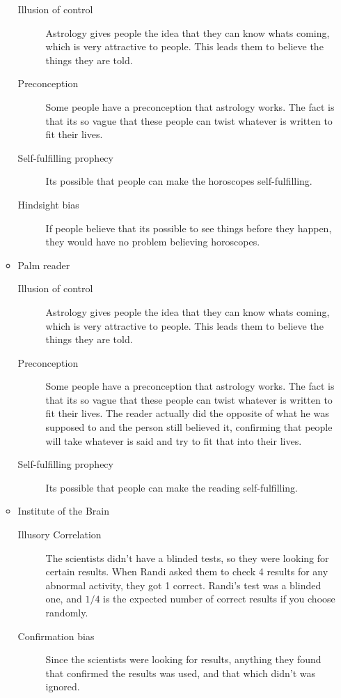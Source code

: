 \documentclass[10pt, a4paper]{article}
\begin{document}
\begin{enumerate}
\begin{itemize}
\begin{description}
          \item[Illusion of control] Astrology gives people the idea that they can know whats coming, which is very attractive to people. This leads them to believe the things they are told.
          \item[Preconception] Some people have a preconception that astrology works. The fact is that its so vague that these people can twist whatever is written to fit their lives.
          \item[Self-fulfilling prophecy] Its possible that people can make the horoscopes self-fulfilling.
          \item[Hindsight bias] If people believe that its possible to see things before they happen, they would have no problem believing horoscopes.
        \end{description}
      \item Palm reader
        \begin{description}
          \item[Illusion of control] Astrology gives people the idea that they can know whats coming, which is very attractive to people. This leads them to believe the things they are told.
          \item[Preconception] Some people have a preconception that astrology works. The fact is that its so vague that these people can twist whatever is written to fit their lives. The reader actually did the opposite of what he was supposed to and the person still believed it, confirming that people will take whatever is said and try to fit that into their lives.
          \item[Self-fulfilling prophecy] Its possible that people can make the reading self-fulfilling.
        \end{description}
      \item Institute of the Brain
        \begin{description}
          \item[Illusory Correlation] The scientists didn't have a blinded tests, so they were looking for certain results. When Randi asked them to check 4 results for any abnormal activity, they got 1 correct. Randi's test was a blinded one, and $1/4$ is the expected number of correct results if you choose randomly.
          \item[Confirmation bias] Since the scientists were looking for results, anything they found that confirmed the results was used, and that which didn't was ignored. 
        \end{description}

\end{itemize}
\end{enumerate}
\end{document}
